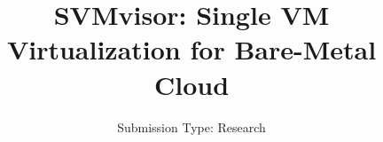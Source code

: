 \documentclass[10pt,twocolumn]{article}
\begin{document}
\title{SVMvisor: Single VM Virtualization for Bare-Metal Cloud}
\author{
\small Submission Type: Research
}
\date{}
\maketitle













\end{document}
